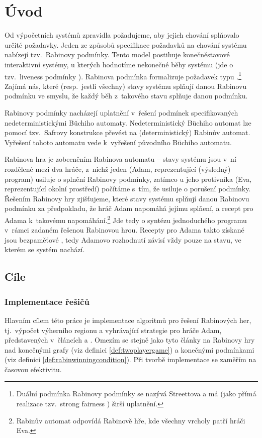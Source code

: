 \chapter{Úvod} \label{chap:intro}
Od výpočetních systémů zpravidla požadujeme, aby jejich chování splňovalo určité požadavky. Jeden ze způsobů specifikace požadavků na chování systému nabízejí tzv.~Rabinovy podmínky. Tento model postihuje konečněstavové interaktivní systémy, u kterých hodnotíme nekonečné běhy systému (jde o tzv.~liveness podmínky \cite[s.~7]{Heljanko2003}). Rabinova podmínka formalizuje požadavek typu .\footnote{Duální podmínka Rabinovy podmínky se nazývá Streettova a má (jako přímá realizace tzv.~strong fairness \cite[s.~12]{Heljanko2003}) širší uplatnění.} Zajímá nás, které (resp.~jestli všechny) stavy systému splňují danou Rabinovu podmínku ve smyslu, že každý běh z~takového stavu splňuje danou podmínku.

Rabinovy podmínky nacházejí uplatnění v~řešení podmínek specifikovaných nedeterministickými Büchiho automaty. Nedeterministický Büchiho automat lze pomocí tzv.~Safrovy konstrukce \cite{Kretinsky2002,Safra1988} převést na (deterministický) Rabinův automat. Vyřešení tohoto automatu vede k~vyřešení původního Büchiho automatu.

Rabinova hra je zobecněním Rabinova automatu -- stavy systému jsou v~ní rozdělené mezi dva hráče, z~nichž jeden (Adam, reprezentující (výsledný) program) usiluje o splnění Rabinovy podmínky, zatímco u jeho protivníka (Eva, reprezentující okolní prostředí) počítáme s~tím, že usiluje o porušení podmínky. Řešením Rabinovy hry zjišťujeme, které stavy systému splňují danou Rabinovu podmínku za předpokladu, že hráč Adam napomáhá jejímu splňení, a recept pro Adama k~takovému napomáhání.\footnote{Rabinův automat odpovídá Rabinově hře, kde všechny vrcholy patří hráči Eva.} Jde tedy o syntézu jednoduchého programu v~rámci zadaném řešenou Rabinovou hrou. Recepty pro Adama takto získané jsou bezpaměťové \cite[s.~2]{Piterman2006}, tedy Adamovo rozhodnutí závisí vždy pouze na stavu, ve kterém se systém nachází.
\section{Cíle}
\subsection{Implementace řešičů}
Hlavním cílem této práce je implementace algoritmů pro řešení Rabinových her, tj.~výpočet výherního regionu a vyhrávající strategie pro hráče Adam, představených v~článcích \cite{Piterman2006} a \cite{Horn2005}. Omezím se stejně jako tyto články na Rabinovy hry nad konečnými grafy (viz definici \ref{def:twoplayergame}) a konečnými podmínkami (viz definici \ref{def:rabinwinningcondition}). Při tvorbě implementace se zaměřím na časovou efektivitu.
